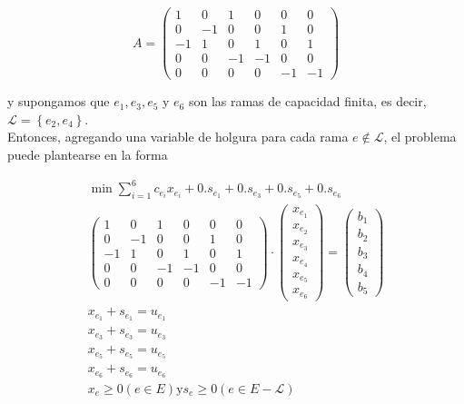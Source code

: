 \documentclass[10pt]{article}
\begin{document}
$$
A=\left(\begin{array}{cccccc}
1 & 0 & 1 & 0 & 0 & 0 \\
0 & -1 & 0 & 0 & 1 & 0 \\
-1 & 1 & 0 & 1 & 0 & 1 \\
0 & 0 & -1 & -1 & 0 & 0 \\
0 & 0 & 0 & 0 & -1 & -1
\end{array}\right)
$$

y supongamos que $e_{1}, e_{3}, e_{5}$ y $e_{6}$ son las ramas de capacidad finita, es decir, $\mathcal{L}=\left\{e_{2}, e_{4}\right\}$.\\
Entonces, agregando una variable de holgura para cada rama $e \notin \mathcal{L}$, el problema puede plantearse en la forma

$$
\begin{gathered}
\min \sum_{i=1}^{6} c_{e_{i}} x_{e_{i}}+0 . s_{e_{1}}+0 . s_{e_{3}}+0 . s_{e_{5}}+0 . s_{e_{6}} \\
\left(\begin{array}{cccccc}
1 & 0 & 1 & 0 & 0 & 0 \\
0 & -1 & 0 & 0 & 1 & 0 \\
-1 & 1 & 0 & 1 & 0 & 1 \\
0 & 0 & -1 & -1 & 0 & 0 \\
0 & 0 & 0 & 0 & -1 & -1
\end{array}\right) \cdot\left(\begin{array}{l}
x_{e_{1}} \\
x_{e_{2}} \\
x_{e_{3}} \\
x_{e_{4}} \\
x_{e_{5}} \\
x_{e_{6}}
\end{array}\right)=\left(\begin{array}{l}
b_{1} \\
b_{2} \\
b_{3} \\
b_{4} \\
b_{5}
\end{array}\right) \\
x_{e_{1}}+s_{e_{1}}=u_{e_{1}} \\
x_{e_{3}}+s_{e_{3}}=u_{e_{3}} \\
x_{e_{5}}+s_{e_{5}}=u_{e_{5}} \\
x_{e_{6}}+s_{e_{6}}=u_{e_{6}} \\
x_{e} \geq 0(e \in E) \mathrm{y} s_{e} \geq 0(e \in E-\mathcal{L})
\end{gathered}
$$
\end{document}
